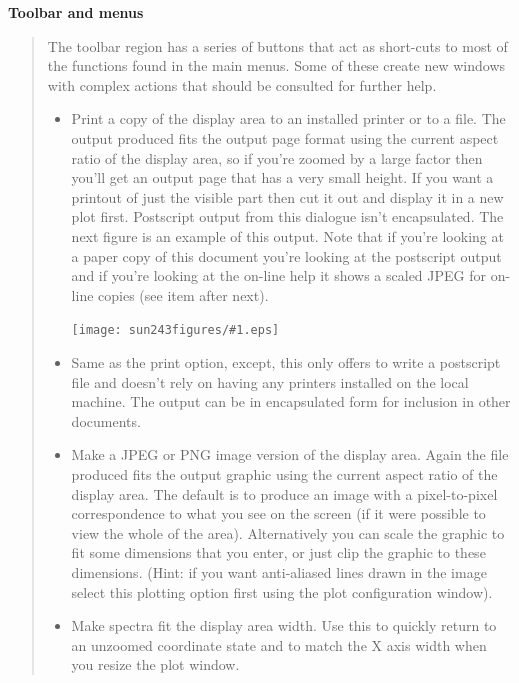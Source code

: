 \documentclass[twoside,11pt]{article}
\newcommand{\htmladdimg}[1]{}
\newcommand{\latexhtml}[2]{#1}
\renewcommand{\_}{\texttt{\symbol{95}}}
\newcommand{\clippedmainfigure}[1]
{\begin{center}
 \latexhtml{\texttt{[image: sun243\_figures/\#1.eps]}}{\htmladdimg{#1.gif}}
 \end{center}
}
\newcommand{\inline}[1]
        {\latexhtml{\texttt{[image: sun243\_figures/\#1.eps]}}
        {\htmladdimg[align=center]{#1.gif}}}
\newcommand{\subheading}[1]{\textbf{\large{#1}}}
\begin{document}
\subheading{Toolbar and menus}
\begin{quote}
 The toolbar region has a series of buttons that act as short-cuts to
 most of the functions found in the main menus. Some of these create
 new windows with complex actions that should be consulted for further
 help.

 \begin{itemize}

  \item[\inline{print}] Print a copy of the display area to an installed
  printer or to a file. The output produced fits the output page format using
  the current aspect ratio of the display area, so if you're zoomed by a large
  factor then you'll get an output page that has a very small height. If you
  want a printout of just the visible part then cut it out and display it in a
  new plot first. Postscript output from this dialogue isn't encapsulated.
  The next figure is an example of this output. Note that if you're looking at
  a paper copy of this document you're looking at the postscript output and if
  you're looking at the on-line help it shows a scaled JPEG for on-line copies
  (see item after next).

  \clippedmainfigure{printoutput}

  \item[\inline{postscriptprint}] Same as the print option, except, this only
  offers to write a postscript file and doesn't rely on having any printers
  installed on the local machine. The output can be in encapsulated form
  for inclusion in other documents.

  \item[\inline{jpegpng}] Make a JPEG or PNG image version of the display
  area. Again the file produced fits the output graphic using the current
  aspect ratio of the display area. The default is to produce an image
  with a pixel-to-pixel correspondence to what you see on the screen
  (if it were possible to view the whole of the area). Alternatively you
  can scale the graphic to fit some dimensions that you enter, or just
  clip the graphic to these dimensions. (Hint: if you want anti-aliased
  lines drawn in the image select this plotting option first using the plot
  configuration window).

  \item[\inline{fitwidth}] Make spectra fit the display area width.  Use this
  to quickly return to an unzoomed coordinate state and to match the X axis
  width when you resize the plot window.


\end{itemize}
\end{quote}
\end{document}
